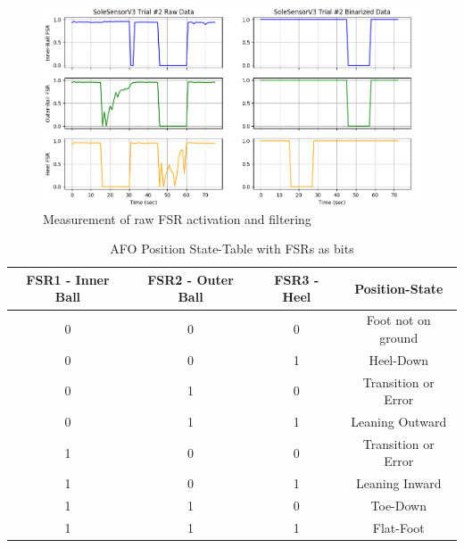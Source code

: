\begin{figure}[h!]
    \centering
    \includegraphics[scale=0.45]{images/mech_design/SoleSensorV3T2_Raw_v_Binarized.png}
    \caption[Measurement of raw FSR]{Measurement of raw FSR activation and filtering \cite{Michaels2020}}
    \label{fig:FSRBinarized}
\end{figure}


\begin{table}[h!]
    \centering
    \begin{tabular}{|c|c|c|c|}
    \hline
    FSR1 - Inner Ball & FSR2 - Outer Ball & FSR3 - Heel & Position-State \\[0.5ex]
    \hline\hline
    0 & 0 & 0 & Foot not on ground \\
    \hline
    0 & 0 & 1 & Heel-Down \\
    \hline
    0 & 1 & 0 & Transition or Error \\
    \hline
    0 & 1 & 1 & Leaning Outward \\
    \hline
    1 & 0 & 0 & Transition or Error \\
    \hline
    1 & 0 & 1 & Leaning Inward \\
    \hline
    1 & 1 & 0 & Toe-Down \\
    \hline
    1 & 1 & 1 & Flat-Foot \\
    \hline
    \end{tabular}
    \caption[AFO State Table]{AFO Position State-Table with FSRs as bits \cite{Michaels2020}}
    \label{tab:statetable}
\end{table}



